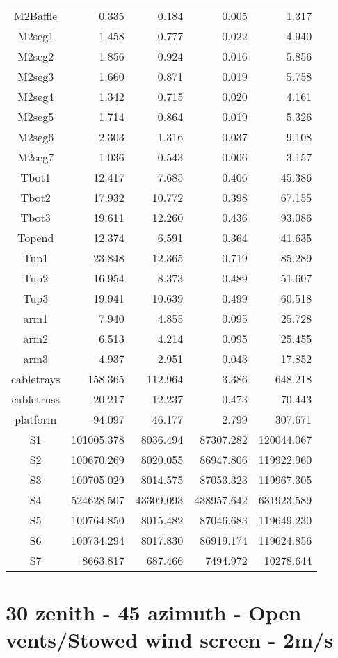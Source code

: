 \begin{longtable}{crrrr}
 M2Baffle & 0.335 & 0.184 & 0.005 & 1.317 \\
 M2seg1 & 1.458 & 0.777 & 0.022 & 4.940 \\
 M2seg2 & 1.856 & 0.924 & 0.016 & 5.856 \\
 M2seg3 & 1.660 & 0.871 & 0.019 & 5.758 \\
 M2seg4 & 1.342 & 0.715 & 0.020 & 4.161 \\
 M2seg5 & 1.714 & 0.864 & 0.019 & 5.326 \\
 M2seg6 & 2.303 & 1.316 & 0.037 & 9.108 \\
 M2seg7 & 1.036 & 0.543 & 0.006 & 3.157 \\
 Tbot1 & 12.417 & 7.685 & 0.406 & 45.386 \\
 Tbot2 & 17.932 & 10.772 & 0.398 & 67.155 \\
 Tbot3 & 19.611 & 12.260 & 0.436 & 93.086 \\
 Topend & 12.374 & 6.591 & 0.364 & 41.635 \\
 Tup1 & 23.848 & 12.365 & 0.719 & 85.289 \\
 Tup2 & 16.954 & 8.373 & 0.489 & 51.607 \\
 Tup3 & 19.941 & 10.639 & 0.499 & 60.518 \\
 arm1 & 7.940 & 4.855 & 0.095 & 25.728 \\
 arm2 & 6.513 & 4.214 & 0.095 & 25.455 \\
 arm3 & 4.937 & 2.951 & 0.043 & 17.852 \\
 cabletrays & 158.365 & 112.964 & 3.386 & 648.218 \\
 cabletruss & 20.217 & 12.237 & 0.473 & 70.443 \\
 platform & 94.097 & 46.177 & 2.799 & 307.671 \\
 S1 & 101005.378 & 8036.494 & 87307.282 & 120044.067 \\
 S2 & 100670.269 & 8020.055 & 86947.806 & 119922.960 \\
 S3 & 100705.029 & 8014.575 & 87053.323 & 119967.305 \\
 S4 & 524628.507 & 43309.093 & 438957.642 & 631923.589 \\
 S5 & 100764.850 & 8015.482 & 87046.683 & 119649.230 \\
 S6 & 100734.294 & 8017.830 & 86919.174 & 119624.856 \\
 S7 & 8663.817 & 687.466 & 7494.972 & 10278.644 \\
\bottomrule
\end{longtable}




\section{30 zenith - 45 azimuth - Open vents/Stowed wind screen - 2m/s}
\label{zen30az045_OS2}

